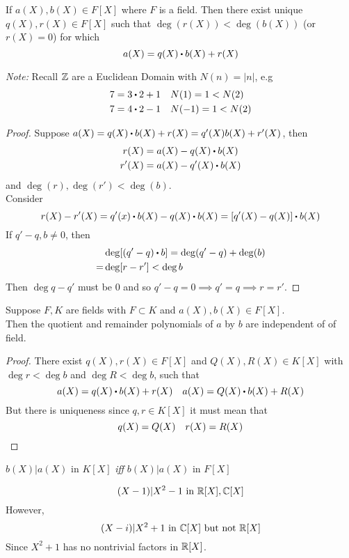 \documentclass[../Main.tex]{subfiles}
\begin{document}
\begin{thm}[title = \texorpdfstring{$F[X]$}{F[X]} satisfies euclidean condition]
	If $a(X),b(X)\in F[X]$ where $F$ is a field. Then there exist unique $q(X),r(X)\in F[X]$ such that $\deg (r(X)) < \deg (b(X))$ (or $r(X)=0$) for which \[a(X)=q(X)\rdot b(X)+r(X)\]
\end{thm}
\textit{Note:} Recall $\mathbb{Z}$ are a Euclidean Domain with $N(n)=|n|$, e.g
\begin{align*}
7=3\rdot 2+1&\quad N(1)=1<N(2)\\
7=4\rdot 2-1&\quad N(-1)=1<N(2)
\end{align*}
\begin{proof}
	Suppose $a(X)=q(X)\rdot b(X)+r(X)=q'(X)b(X)+r'(X)$, then
	\begin{align*}
	r(X)&=a(X)-q(X)\rdot b(X)\\
	r'(X)&=a(X)-q'(X)\rdot b(X)
	\end{align*}
	and $\deg(r),\deg(r')<\deg(b)$.\\
	Consider
	\[r(X)-r'(X)=q'(x)\rdot b(X)-q(X)\rdot b(X) = [q'(X)-q(X)]\rdot b(X)\]
	If $q'-q,b\ne 0$, then 
	\begin{align*}
	&\deg[(q'-q)\rdot b]=\deg(q'-q)+\deg(b)\\
	=&\deg[r-r']<\deg b
	\end{align*}
	Then $\deg{q-q'}$ must be $0$ and so $q'-q=0\implies q'=q\implies r=r'$.
\end{proof}
\begin{crl}[title = ]
	Suppose $F,K$ are fields with $F\subset K$ and $a(X),b(X)\in F[X]$. \\
	Then the quotient and remainder polynomials of $a$ by $b$ are independent of of field.
\end{crl}
\begin{proof}
	There exist $q(X),r(X)\in F[X]$ and $Q(X), R(X)\in K[X]$ with $\deg r< \deg b$ and $\deg R< \deg b$, such that
	\[a(X)=q(X)\rdot b(X)+r(X)\quad a(X)=Q(X)\rdot b(X)+R(X)\]
	But there is uniqueness since $q,r\in K[X]$ it must mean that
	\[q(X)=Q(X)\quad r(X)=R(X)\qedhere\]
\end{proof}
\begin{crl}
	$b(X)|a(X)$ in $K[X]$ \textit{iff} $b(X)|a(X)$ in $F[X]$
\end{crl}
\begin{example}
	\[(X-1)|X^2-1 \text{ in } \mathbb{R}[X],\mathbb{C}[X]\]
	However,
	\[(X-i)| X^2+1 \text{ in } \mathbb{C}[X] \text{ but not } \mathbb{R}[X]\]
	Since $X^2+1$ has no nontrivial factors in $\mathbb{R}[X]$.
\end{example}
\end{document}
